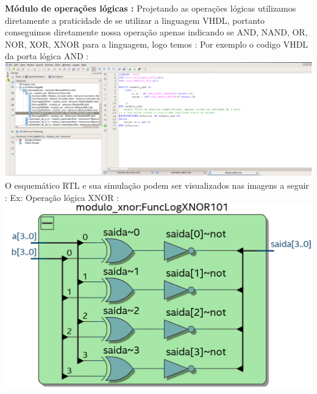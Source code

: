 \documentclass[11pt]{book}
\begin{document}
\newpage \textbf{Módulo de operações lógicas :} 
\newline\newline
Projetando as operações lógicas utilizamos diretamente a praticidade de se utilizar a linguagem VHDL, portanto conseguimos diretamente nossa operação apenas indicando se AND, NAND, OR, NOR, XOR, XNOR para a linguagem, logo temos : 
Por exemplo o codigo VHDL da porta lógica AND :
\newline\newline
\includegraphics[width=1.1\textwidth]{codigo_andgate.png}%
\newline
O esquemático RTL e sua simulação podem ser visualizados nas imagens a seguir :
\newline
Ex: Operação lógica XNOR : 
\newline
\includegraphics[width=1.1\textwidth]{RTL_xnor.png}%
\newline\newline
\end{document}
